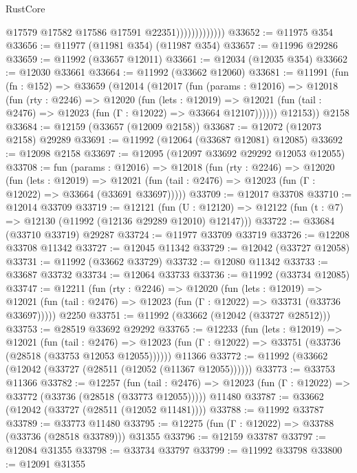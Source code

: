 \begin{lexlean}{RustCore}
\begin{coremodule}
                              @17579
                              @17582
                              @17586
                              @17591
                              @22351)))))))))))))
@33652 := @11975 @354
@33656 := @11977 (@11981 @354) (@11987 @354)
@33657 := @11996 @29286
@33659 := @11992 (@33657 @12011)
@33661 := @12034 (@12035 @354)
@33662 := @12030 @33661
@33664 := @11992 (@33662 @12060)
@33681 := @11991
    (fun (fn : @152) =>
    @33659
      (@12014
        (@12017
          (fun (params : @12016) =>
          @12018
            (fun (rty : @2246) =>
            @12020
              (fun (lets : @12019) =>
              @12021 (fun (tail : @2476) => @12023 (fun (Γ : @12022) => @33664 @12107))))))
        @12153))
    @2158
@33684 := @12159 (@33657 (@12009 @2158))
@33687 := @12072 (@12073 @2158) @29289
@33691 := @11992 (@12064 (@33687 @12081) @12085)
@33692 := @12098 @2158
@33697 := @12095 (@12097 @33692 @29292 @12053 @12055)
@33708 := fun (params : @12016) =>
  @12018
    (fun (rty : @2246) =>
    @12020
      (fun (lets : @12019) =>
      @12021 (fun (tail : @2476) => @12023 (fun (Γ : @12022) => @33664 (@33691 @33697)))))
@33709 := @12017 @33708
@33710 := @12014 @33709
@33719 := @12121
    (fun (U : @12120) => @12122 (fun (t : @7) => @12130 (@11992 (@12136 @29289 @12010) @12147)))
@33722 := @33684 (@33710 @33719) @29287
@33724 := @11977 @33709 @33719
@33726 := @12208 @33708 @11342
@33727 := @12045 @11342
@33729 := @12042 (@33727 @12058)
@33731 := @11992 (@33662 @33729)
@33732 := @12080 @11342
@33733 := @33687 @33732
@33734 := @12064 @33733
@33736 := @11992 (@33734 @12085)
@33747 := @12211
    (fun (rty : @2246) =>
    @12020
      (fun (lets : @12019) =>
      @12021 (fun (tail : @2476) => @12023 (fun (Γ : @12022) => @33731 (@33736 @33697)))))
    @2250
@33751 := @11992 (@33662 (@12042 (@33727 @28512)))
@33753 := @28519 @33692 @29292
@33765 := @12233
    (fun (lets : @12019) =>
    @12021
      (fun (tail : @2476) =>
      @12023 (fun (Γ : @12022) => @33751 (@33736 (@28518 (@33753 @12053 @12055))))))
    @11366
@33772 := @11992 (@33662 (@12042 (@33727 (@28511 (@12052 (@11367 @12055))))))
@33773 := @33753 @11366
@33782 := @12257
    (fun (tail : @2476) => @12023 (fun (Γ : @12022) => @33772 (@33736 (@28518 (@33773 @12055)))))
    @11480
@33787 := @33662 (@12042 (@33727 (@28511 (@12052 @11481))))
@33788 := @11992 @33787
@33789 := @33773 @11480
@33795 := @12275 (fun (Γ : @12022) => @33788 (@33736 (@28518 @33789))) @31355
@33796 := @12159 @33787
@33797 := @12084 @31355
@33798 := @33734 @33797
@33799 := @11992 @33798
@33800 := @12091 @31355

\end{coremodule}
\end{lexlean}
